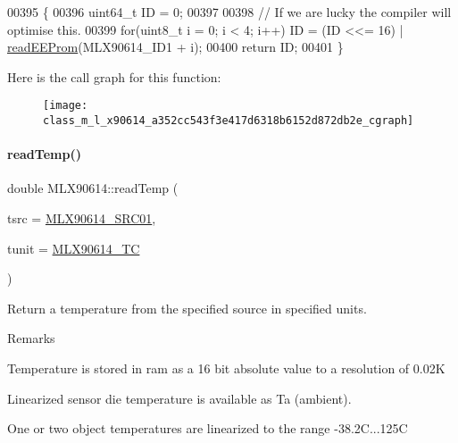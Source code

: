 \begin{DoxyCode}
00395                               \{
00396     uint64\_t ID = 0;
00397 
00398     \textcolor{comment}{// If we are lucky the compiler will optimise this.}
00399     \textcolor{keywordflow}{for}(uint8\_t i = 0; i < 4; i++) ID = (ID <<= 16) | \mbox{\hyperlink{class_m_l_x90614_aab0a010875527f4ac3d2794017624b10}{readEEProm}}(MLX90614\_ID1 + i);
00400     \textcolor{keywordflow}{return} ID;
00401 \}
\end{DoxyCode}
Here is the call graph for this function\+:\nopagebreak
\begin{figure}[H]
\begin{center}
\leavevmode
\texttt{[image: class\_m\_l\_x90614\_a352cc543f3e417d6318b6152d872db2e\_cgraph]}
\end{center}
\end{figure}
\mbox{\label{class_m_l_x90614_ab2a8bafff744a249325105d238bfe248}} 
\paragraph{\texorpdfstring{read\+Temp()}{readTemp()}}
{\footnotesize\ttfamily double M\+L\+X90614\+::read\+Temp (\begin{DoxyParamCaption}\item[{\mbox{\hyperlink{class_m_l_x90614_a500f8c49b00e725d5c201092d9c02b8b}{temp\+Src\+\_\+t}}}]{tsrc = {\ttfamily \mbox{\hyperlink{class_m_l_x90614_a500f8c49b00e725d5c201092d9c02b8ba91f620721ea47dec379db791d735a55b}{M\+L\+X90614\+\_\+\+S\+R\+C01}}},  }\item[{\mbox{\hyperlink{class_m_l_x90614_a18769519e647d93c959566b81d2e514f}{temp\+Unit\+\_\+t}}}]{tunit = {\ttfamily \mbox{\hyperlink{class_m_l_x90614_a18769519e647d93c959566b81d2e514fa75d66a29cab65ff4514b5cd6a268c7bf}{M\+L\+X90614\+\_\+\+TC}}} }\end{DoxyParamCaption})}



Return a temperature from the specified source in specified units. 

\begin{DoxyRemark}{Remarks}
\begin{DoxyItemize}
\item Temperature is stored in ram as a 16 bit absolute value to a resolution of 0.\+02K \item Linearized sensor die temperature is available as Ta (ambient). \item One or two object temperatures are linearized to the range -\/38.\+2C...125C \end{DoxyItemize}

\end{DoxyRemark}

